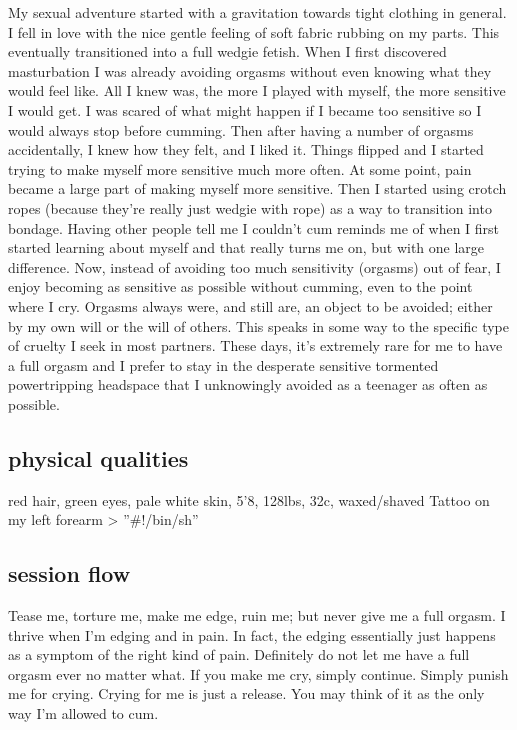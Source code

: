 \documentclass{article}
\begin{document}
My sexual adventure started with a gravitation towards tight clothing in general.
I fell in love with the nice gentle feeling of soft fabric rubbing on my parts.
This eventually transitioned into a full wedgie fetish.
When I first discovered masturbation I was already avoiding orgasms without even knowing what they would feel like.
All I knew was, the more I played with myself, the more sensitive I would get.
I was scared of what might happen if I became too sensitive so I would always stop before cumming.
Then after having a number of orgasms accidentally, I knew how they felt, and I liked it.
Things flipped and I started trying to make myself more sensitive much more often.
At some point, pain became a large part of making myself more sensitive.
Then I started using crotch ropes (because they're really just wedgie with rope) as a way to transition into bondage.
Having other people tell me I couldn't cum reminds me of when I first started learning about myself and that really turns me on, but with one large difference.
Now, instead of avoiding too much sensitivity (orgasms) out of fear, I enjoy becoming as sensitive as possible without cumming, even to the point where I cry.
Orgasms always were, and still are, an object to be avoided; either by my own will or the will of others.
This speaks in some way to the specific type of cruelty I seek in most partners.
These days, it's extremely rare for me to have a full orgasm and I prefer to stay in the desperate sensitive tormented powertripping headspace that I unknowingly avoided as a teenager as often as possible.

\subsection{physical qualities}

red hair, green eyes, pale white skin, 5'8, 128lbs, 32c, waxed/shaved
Tattoo on my left forearm \textgreater{} ''\#!/bin/sh''

\subsection{session flow}

Tease me, torture me, make me edge, ruin me; but never give me a full orgasm.
I thrive when I'm edging and in pain.
In fact, the edging essentially just happens as a symptom of the right kind of pain.
Definitely do not let me have a full orgasm ever no matter what.
If you make me cry, simply continue. Simply punish me for crying.
Crying for me is just a release. You may think of it as the only way I'm allowed to cum.
\end{document}
